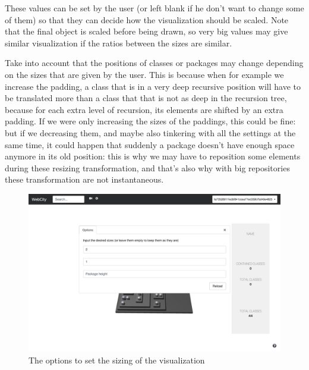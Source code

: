 \documentclass[]{usiinfbachelorproject}
\begin{document}
These values can be set by the user (or left blank if he don't want to change some of them) so that they can decide how the visualization should be scaled. Note that the final object is scaled before being drawn, so very big values may give similar visualization if the ratios between the sizes are similar.

Take into account that the positions of classes or packages may change depending on the sizes that are given by the user. This is because when for example we increase the padding, a class that is in a very deep recursive position will have to be translated more than a class that that is not as deep in the recursion tree, because for each extra level of recursion, its elements are shifted by an extra padding. If we were only increasing the sizes of the paddings, this could be fine: but if we decreasing them, and maybe also tinkering with all the settings at the same time, it could happen that suddenly a package doesn't have enough space anymore in its old position: this is why we may have to reposition some elements during these resizing transformation, and that's also why with big repositories these transformation are not instantaneous.

\begin{figure} [H]
\centering
\includegraphics[width=1\textwidth]{pictures/sizing_card.png}
\caption{The options to set the sizing of the visualization}
\label{fig:sizing}
\end{figure}
\end{document}
